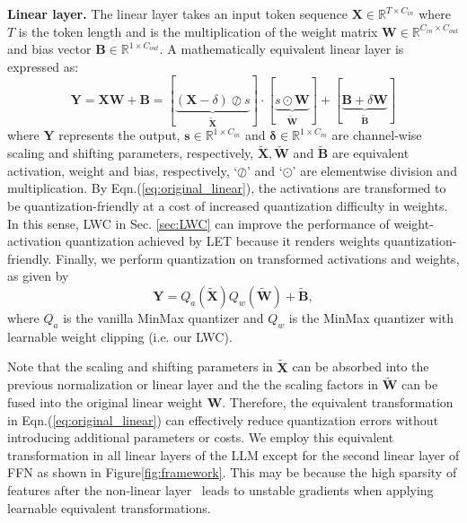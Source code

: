 \documentclass{article} %
\begin{document}
\textbf{Linear layer.} The linear layer takes an input token sequence $\mathbf{X} \in \mathbb{R}^{T\times C_{in}}$ where $T$ is the token length and is the multiplication of the weight matrix $\mathbf{W} \in \mathbb{R}^{C_{in} \times C_{out}}$ and bias vector $\mathbf{B}\in\mathbb{R}^{1 \times C_{out}}$. A mathematically equivalent linear layer is expressed as:
\begin{equation}\label{eq:original_linear}
    \mathbf{Y} = \mathbf{X}\mathbf{W} + \mathbf{B} = [\underbrace{(\mathbf{X}-\delta)\oslash s}_{\tilde{\mathbf{X}}}]\cdot[\underbrace{s\odot \mathbf{W}}_{\tilde{\mathbf{W}}}] + [\underbrace{\mathbf{B} + \delta\mathbf{W}}_{\tilde{\mathbf{B}}}]
\end{equation}
where $\mathbf{Y}$ represents the output,  $\mathbf{s} \in \mathbb{R} ^{1\times C_{in}}$ and $\mathbf{\delta} \in \mathbb{R}^{1\times C_{in}}$ are channel-wise scaling and shifting parameters, respectively, $\tilde{\mathbf{X}}, \tilde{\mathbf{W}}$ and $\tilde{\mathbf{B}}$ are equivalent activation, weight and bias, respectively, `$\oslash$' and `$\odot$' are elementwise division and multiplication. By Eqn.(\ref{eq:original_linear}), the activations are transformed to be quantization-friendly at a cost of increased quantization difficulty in weights. In this sense, LWC in Sec. \ref{sec:LWC} can improve the performance of weight-activation quantization achieved by LET because it renders weights quantization-friendly. Finally, we perform quantization on transformed activations and weights, as given by
%
\begin{equation}\label{eq:LET-linear}
    \mathbf{Y} = Q_a(\tilde{\mathbf{X}}) Q_w(\tilde{\mathbf{W}}) + \widetilde{\mathbf{B}},
\end{equation}
where $Q_a$ is the vanilla MinMax quantizer and $Q_w$ is the MinMax quantizer with learnable weight clipping (i.e. our LWC).

Note that the scaling and shifting parameters in $\tilde{\mathbf{X}}$ can be absorbed into the previous normalization or linear layer and the the scaling factors in $\tilde{\mathbf{W}}$ can be fused into the original linear weight $\mathbf{W}$. Therefore, the equivalent transformation in Eqn.(\ref{eq:original_linear}) can effectively reduce quantization errors without introducing additional parameters or costs. We employ this equivalent transformation in all linear layers of the LLM except for the second linear layer of FFN as shown in Figure\ref{fig:framework}. This may be because the high sparsity of features after the non-linear layer~\citep{dejavu} leads to unstable gradients when applying learnable equivalent transformations.
\end{document}
